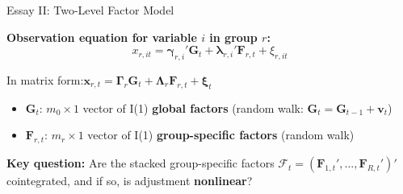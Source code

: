 \documentclass{beamer}
\begin{document}
\begin{frame}{Essay II: Two-Level Factor Model}

\textbf{Observation equation for variable $i$ in group $r$:}
\[
x_{r,it} = \boldsymbol{\gamma}_{r,i}'\boldsymbol{G}_t + \boldsymbol{\lambda}_{r,i}'\boldsymbol{F}_{r,t} + \xi_{r,it}
\]

In matrix form:\quad $\boldsymbol{x}_{r,t} = \boldsymbol{\Gamma}_r\boldsymbol{G}_t + \boldsymbol{\Lambda}_r\boldsymbol{F}_{r,t} + \boldsymbol{\xi}_t$

\begin{itemize}
  \item $\boldsymbol{G}_t$: $m_0\times1$ vector of I(1) \textbf{global factors} (random walk: $\boldsymbol{G}_t = \boldsymbol{G}_{t-1}+\boldsymbol{v}_t$)
  \item $\boldsymbol{F}_{r,t}$: $m_r\times1$ vector of I(1) \textbf{group-specific factors} (random walk)
\end{itemize}

\vspace{0.5em}
\textbf{Key question:} Are the stacked group-specific factors
$\boldsymbol{\mathcal{F}}_t = (\boldsymbol{F}_{1,t}',\ldots,\boldsymbol{F}_{R,t}')'$
cointegrated, and if so, is adjustment \textbf{nonlinear}?

\end{frame}
\end{document}
